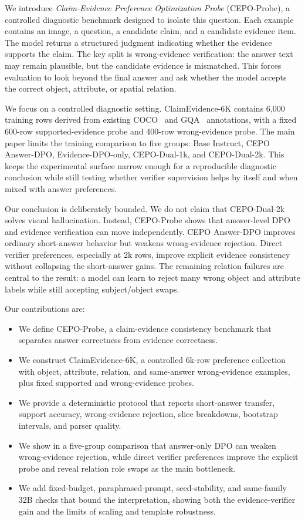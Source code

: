 \documentclass[10pt,twocolumn,letterpaper]{article}
\newcommand{\benchmark}{CEPO-Probe}
\newcommand{\dataset}{ClaimEvidence-6K}
\newcommand{\answerdpo}{CEPO Answer-DPO}
\newcommand{\evidencedpo}{Evidence-DPO-only}
\newcommand{\dualonek}{CEPO-Dual-1k}
\newcommand{\dualtwok}{CEPO-Dual-2k}
\begin{document}
We introduce \emph{Claim-Evidence Preference Optimization Probe}
(\benchmark{}), a controlled diagnostic benchmark designed to isolate this
question. Each example contains an image, a question, a candidate claim, and a
candidate evidence item. The model returns a structured judgment indicating
whether the evidence supports the claim. The key split is wrong-evidence
verification: the answer text may remain plausible, but the candidate evidence
is mismatched. This forces evaluation to look beyond the final answer and ask
whether the model accepts the correct object, attribute, or spatial relation.

We focus on a controlled diagnostic setting. \dataset{} contains 6{,}000
training rows derived from existing COCO~\cite{coco} and GQA~\cite{gqa}
annotations, with a fixed 600-row supported-evidence probe and 400-row
wrong-evidence probe. The main paper limits the training comparison to five
groups: Base Instruct, \answerdpo{}, \evidencedpo{}, \dualonek{}, and
\dualtwok{}. This keeps the experimental surface narrow enough for a
reproducible diagnostic conclusion while still testing whether verifier
supervision helps by itself and when mixed with answer preferences.

Our conclusion is deliberately bounded. We do not claim that \dualtwok{}
solves visual hallucination. Instead, \benchmark{} shows that answer-level DPO
and evidence verification can move independently. \answerdpo{} improves
ordinary short-answer behavior but weakens wrong-evidence rejection. Direct
verifier preferences, especially at 2k rows, improve explicit evidence
consistency without collapsing the short-answer gains. The remaining relation
failures are central to the result: a model can learn to reject many wrong
object and attribute labels while still accepting subject/object swaps.

Our contributions are:
\begin{itemize}
    \item We define \benchmark{}, a claim-evidence consistency benchmark that
    separates answer correctness from evidence correctness.
    \item We construct \dataset{}, a controlled 6k-row preference collection
    with object, attribute, relation, and same-answer wrong-evidence examples,
    plus fixed supported and wrong-evidence probes.
    \item We provide a deterministic protocol that reports short-answer
    transfer, support accuracy, wrong-evidence rejection, slice breakdowns,
    bootstrap intervals, and parser quality.
    \item We show in a five-group comparison that answer-only DPO can weaken
    wrong-evidence rejection, while direct verifier preferences improve the
    explicit probe and reveal relation role swaps as the main bottleneck.
    \item We add fixed-budget, paraphrased-prompt, seed-stability, and
    same-family 32B checks that bound the interpretation, showing both the
    evidence-verifier gain and the limits of scaling and template robustness.
\end{itemize}
\end{document}
